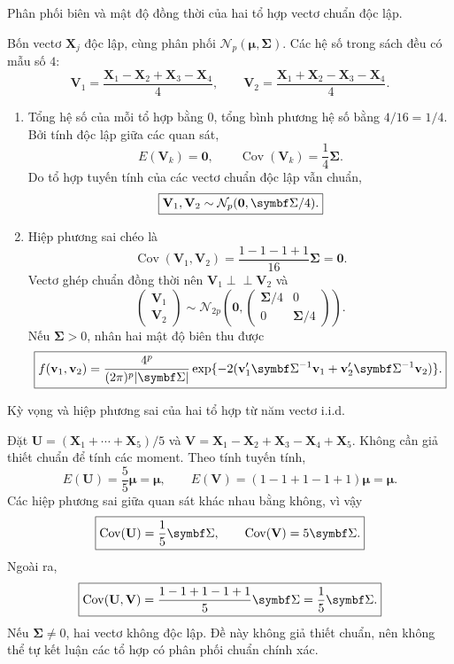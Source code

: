\begin{problem}[Bài 4.16.]
Phân phối biên và mật độ đồng thời của hai tổ hợp vectơ chuẩn độc lập.
\end{problem}
\begin{solution}
Bốn vectơ $\mathbf X_j$ độc lập, cùng phân phối $\mathcal N_p(\boldsymbol\mu,\boldsymbol\Sigma)$.
Các hệ số trong sách đều có mẫu số $4$:
\[
\mathbf V_1=\frac{\mathbf X_1-\mathbf X_2+\mathbf X_3-\mathbf X_4}{4},\qquad
\mathbf V_2=\frac{\mathbf X_1+\mathbf X_2-\mathbf X_3-\mathbf X_4}{4}.
\]
\begin{enumerate}[label=\textbf{\alph*)}]
\item Tổng hệ số của mỗi tổ hợp bằng $0$, tổng bình phương hệ số bằng $4/16=1/4$.
Bởi tính độc lập giữa các quan sát,
\[
E(\mathbf V_k)=\mathbf0,\qquad\operatorname{Cov}(\mathbf V_k)=\frac14\boldsymbol\Sigma.
\]
Do tổ hợp tuyến tính của các vectơ chuẩn độc lập vẫn chuẩn,
\[
\answer{\mathbf V_1,\mathbf V_2\sim\mathcal N_p(\mathbf0,\boldsymbol\Sigma/4).}
\]
\item Hiệp phương sai chéo là
\[
\operatorname{Cov}(\mathbf V_1,\mathbf V_2)
=\frac{1-1-1+1}{16}\boldsymbol\Sigma=\mathbf0.
\]
Vectơ ghép chuẩn đồng thời nên $\mathbf V_1\perp\!\!\!\perp\mathbf V_2$ và
\[
\begin{pmatrix}\mathbf V_1\\\mathbf V_2\end{pmatrix}
\sim\mathcal N_{2p}\left(\mathbf0,
\begin{pmatrix}\boldsymbol\Sigma/4&0\\0&\boldsymbol\Sigma/4\end{pmatrix}\right).
\]
Nếu $\boldsymbol\Sigma>0$, nhân hai mật độ biên thu được
\[
\answer{f(\mathbf v_1,\mathbf v_2)=\frac{4^p}{(2\pi)^p|\boldsymbol\Sigma|}
\exp\{-2(\mathbf v_1'\boldsymbol\Sigma^{-1}\mathbf v_1+
\mathbf v_2'\boldsymbol\Sigma^{-1}\mathbf v_2)\}.}
\]
\end{enumerate}
\end{solution}

\begin{problem}[Bài 4.17.]
Kỳ vọng và hiệp phương sai của hai tổ hợp từ năm vectơ i.i.d.
\end{problem}
\begin{solution}
Đặt $\mathbf U=(\mathbf X_1+\cdots+\mathbf X_5)/5$ và
$\mathbf V=\mathbf X_1-\mathbf X_2+\mathbf X_3-\mathbf X_4+\mathbf X_5$.
Không cần giả thiết chuẩn để tính các moment. Theo tính tuyến tính,
\[
E(\mathbf U)=\frac55\boldsymbol\mu=\boldsymbol\mu,\qquad
E(\mathbf V)=(1-1+1-1+1)\boldsymbol\mu=\boldsymbol\mu.
\]
Các hiệp phương sai giữa quan sát khác nhau bằng không, vì vậy
\[
\answer{\operatorname{Cov}(\mathbf U)=\frac15\boldsymbol\Sigma,\qquad
\operatorname{Cov}(\mathbf V)=5\boldsymbol\Sigma.}
\]
Ngoài ra,
\[
\answer{\operatorname{Cov}(\mathbf U,\mathbf V)
=\frac{1-1+1-1+1}{5}\boldsymbol\Sigma=\frac15\boldsymbol\Sigma.}
\]
Nếu $\boldsymbol\Sigma\ne0$, hai vectơ không độc lập. Đề này không giả thiết
chuẩn, nên không thể tự kết luận các tổ hợp có phân phối chuẩn chính xác.
\end{solution}


